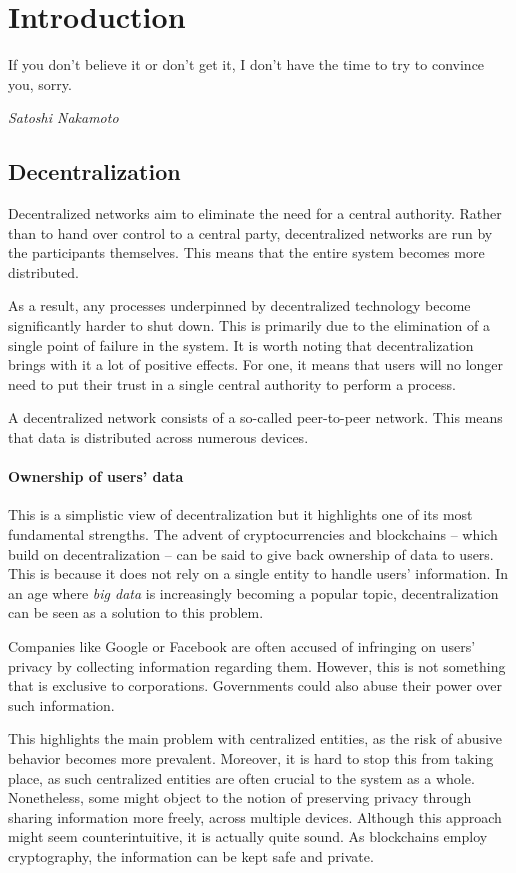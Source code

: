 \chapter{Introduction}
%
\epigraph{If you don’t believe it or don’t get it, I don’t have the time to try to convince you, sorry.}{\textit{Satoshi Nakamoto}}
%

\section{Decentralization}
Decentralized networks aim to eliminate the need for a central authority. Rather than to hand over control to a central party, decentralized networks are run by the participants themselves. This means that the entire system becomes more distributed.

As a result, any processes underpinned by decentralized technology become significantly harder to shut down. This is primarily due to the elimination of a single point of failure in the system. It is worth noting that decentralization brings with it a lot of positive effects. For one, it means that users will no longer need to put their trust in a single central authority to perform a process.

A decentralized network consists of a so-called peer-to-peer network. This means that data is distributed across numerous devices.

\subsubsection{Ownership of users' data}
This is a simplistic view of decentralization but it highlights one of its most fundamental strengths. The advent of cryptocurrencies and blockchains – which build on decentralization – can be said to give back ownership of data to users. This is because it does not rely on a single entity to handle users’ information. In an age where \emph{big data} is increasingly becoming a popular topic, decentralization can be seen as a solution to this problem.

Companies like Google or Facebook are often accused of infringing on users' privacy by collecting information regarding them. However, this is not something that is exclusive to corporations. Governments could also abuse their power over such information.

This highlights the main problem with centralized entities, as the risk of abusive behavior becomes more prevalent. Moreover, it is hard to stop this from taking place, as such centralized entities are often crucial to the system as a whole. Nonetheless, some might object to the notion of preserving privacy through sharing information more freely, across multiple devices. Although this approach might seem counterintuitive, it is actually quite sound. As blockchains employ cryptography, the information can be kept safe and private.


